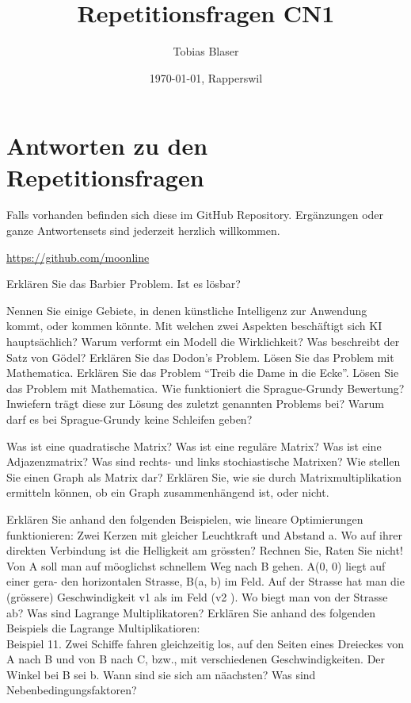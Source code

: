 \documentclass[ngerman,a4paper,12pt]{scrreprt}
\title{Repetitionsfragen CN1}
\author{Tobias Blaser}
\date{\today{}, Rapperswil}
\begin{document}
\tableofcontents

\vspace{1cm}
\section*{Antworten zu den Repetitionsfragen}
Falls vorhanden befinden sich diese im GitHub Repository. Ergänzungen oder ganze Antwortensets sind jederzeit herzlich willkommen.

\noindent\url{https://github.com/moonline}
\clearpage

\ol
	\li Erklären Sie das Barbier Problem. Ist es lösbar?
\olS

\olR
	\li Nennen Sie einige Gebiete, in denen künstliche Intelligenz zur Anwendung kommt, oder kommen könnte.
	\li Mit welchen zwei Aspekten beschäftigt sich KI hauptsächlich?
	\li Warum verformt ein Modell die Wirklichkeit?
	\li Was beschreibt der Satz von Gödel?
	\li Erklären Sie das Dodon's Problem. Lösen Sie das Problem mit Mathematica.
	\li Erklären Sie das Problem ``Treib die Dame in die Ecke''. Lösen Sie das Problem mit Mathematica.
	\li Wie funktioniert die Sprague-Grundy Bewertung? Inwiefern trägt diese zur Lösung des zuletzt genannten Problems bei? Warum darf es bei Sprague-Grundy keine Schleifen geben?
\olS

\olR
	\li Was ist eine quadratische Matrix?
	\li Was ist eine reguläre Matrix?
	\li Was ist eine Adjazenzmatrix?
	\li Was sind rechts- und links stochiastische Matrixen?
	\li Wie stellen Sie einen Graph als Matrix dar?
	\li Erklären Sie, wie sie durch Matrixmultiplikation ermitteln können, ob ein Graph zusammenhängend ist, oder nicht.
\olS


\olR
	\li Erklären Sie anhand den folgenden Beispielen, wie lineare Optimierungen funktionieren:
		\ol
			\li Zwei Kerzen mit gleicher Leuchtkraft und Abstand a. Wo auf ihrer direkten Verbindung ist die Helligkeit am grössten? Rechnen Sie, Raten Sie nicht!
			\li Von A soll man auf möoglichst schnellem Weg nach B gehen. A(0, 0) liegt auf einer gera-
den horizontalen Strasse, B(a, b) im Feld. Auf der Strasse hat man die (grössere) Geschwindigkeit
v1 als im Feld (v2 ). Wo biegt man von der Strasse ab?
		\olE
	\li Was sind Lagrange Multiplikatoren? Erklären Sie anhand des folgenden Beispiels die Lagrange Multiplikatioren: \\
		Beispiel 11. Zwei Schiffe fahren gleichzeitig los, auf den Seiten eines Dreieckes von A nach B und von B nach C, bzw., mit verschiedenen Geschwindigkeiten. Der Winkel bei B sei b. Wann sind
sie sich am näachsten?
	\li Was sind Nebenbedingungsfaktoren?
\olS
\end{document}
